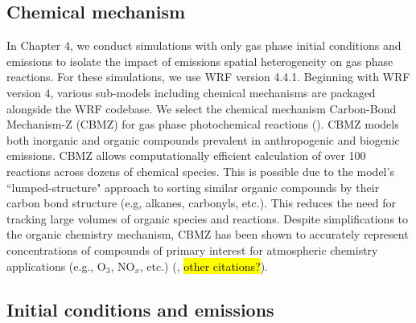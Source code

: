 \subsection{Chemical mechanism}
In Chapter 4, we conduct simulations with only gas phase initial conditions and emissions to isolate the impact of emissions spatial heterogeneity on gas phase reactions. For these simulations, we use WRF version 4.4.1. Beginning with WRF version 4, various sub-models including chemical mechanisms are packaged alongside the WRF codebase. We select the chemical mechanism Carbon-Bond Mechanism-Z (CBMZ) for gas phase photochemical reactions (\cite{zaveri_new_1999}). CBMZ models both inorganic and organic compounds prevalent in anthropogenic and biogenic emissions. CBMZ allows computationally efficient calculation of over 100 reactions across dozens of chemical species. This is possible due to the model's ``lumped-structure" approach to sorting similar organic compounds by their carbon bond structure (e.g, alkanes, carbonyls, etc.). This reduces the need for tracking large volumes of organic species and reactions. Despite simplifications to the organic chemistry mechanism, CBMZ has been shown to accurately represent concentrations of compounds of primary interest for atmospheric chemistry applications (e.g., O$_3$, NO$_x$, etc.) (\cite{zaveri_new_1999}, \hl{other citations?}). 

\subsection{Initial conditions and emissions}\label{gas-phase-ics-and-emiss}

